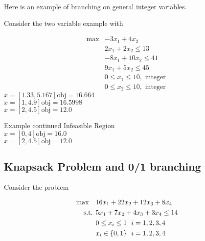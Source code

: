 %
%
%




Here is an example of branching on general integer variables.

\begin{example}{}{}
Consider the two variable example with
 
 \begin{align*}
 \max & -3x_1 + 4x_2\\
 & 2x_1 + 2 x_2 \leq 13\\
 & -8 x_1 + 10x_2 \leq 41\\
 & 9x_1 + 5x_2 \leq 45\\
 & 0 \leq x_1 \leq 10, \text{ integer }\\
 & 0 \leq x_2 \leq 10, \text{ integer }
 \end{align*}
$x =  [1.33, 5.167]  \textrm{obj} =  16.664$\\
\noindent {}
$x =  [1,  4.9]  \textrm{obj} =  16.5998$\\
$x =  [2,  4.5]  \textrm{obj} =  12.0$\\

\end{example}

\begin{example}{Example continued}{}
Infeasible Region\\
$x =  [0, 4]  \textrm{obj} =  16.0$\\
$x =  [2,  4.5]  \textrm{obj} =  12.0$\\

\end{example}



\subsection{Knapsack Problem  and 0/1 branching}

Consider the problem 

\begin{align*}
\max \quad & 16x_1 + 22x_2 + 12x_3 + 8 x_4\\
\mbox{ s.t. } & 5x_1 + 7x_2 + 4x_3 + 3x_4 \leq 14\\
& 0 \leq x_i \leq 1 \ \ i=1,2,3,4\\
& x_i \in \{0,1\} \ \ i=1,2,3,4
\end{align*}

